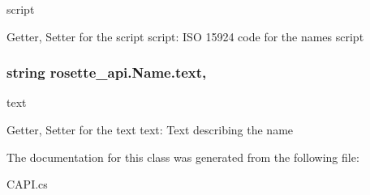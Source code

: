 script 

Getter, Setter for the script script\+: I\+S\+O 15924 code for the name\textquotesingle{}s script \hypertarget{classrosette__api_1_1_name_aea41eeac4d108ba05e5b2857f41752e5}{}
\subsubsection[{text}]{\setlength{\rightskip}{0pt plus 5cm}string rosette\+\_\+api.\+Name.\+text\hspace{0.3cm}{\ttfamily [get]}, {\ttfamily [set]}}\label{classrosette__api_1_1_name_aea41eeac4d108ba05e5b2857f41752e5}


text 

Getter, Setter for the text text\+: Text describing the name 

The documentation for this class was generated from the following file\+:\begin{DoxyCompactItemize}
\item 
C\+A\+P\+I.\+cs\end{DoxyCompactItemize}
